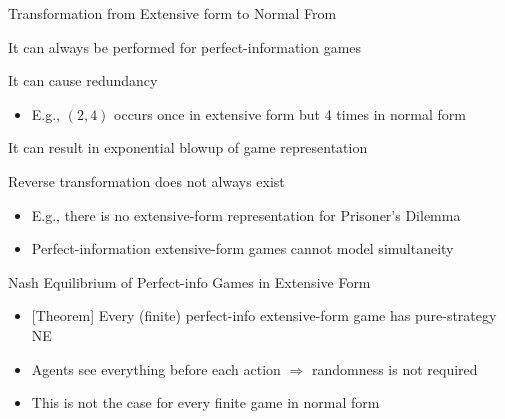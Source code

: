 \documentclass[11pt,aspectratio=169]{beamer}
\begin{document}
  \begin{frame}{Transformation from Extensive form to Normal From}
   \begin{itemizes}
    \item It can \alert{always} be performed for perfect-information games
    \item It can cause redundancy
    \begin{itemize}
     \item E.g., $(2, 4)$ occurs once in extensive form but 4 times in normal form
    \end{itemize}
    \item It can result in \alert{exponential blowup} of game representation
    \item Reverse transformation does not always exist
    \begin{itemize}
     \item E.g., there is \alert{no} extensive-form representation for Prisoner's Dilemma
     \item Perfect-information extensive-form games cannot model \alert{simultaneity}
    \end{itemize}
   \end{itemizes}
  \end{frame}

 
  \begin{frame}{Nash Equilibrium of Perfect-info Games in Extensive Form}
   \begin{itemize}
   \setlength{\itemsep}{1.5em}
    \item \alert{[Theorem]} Every (finite) perfect-info extensive-form game has \alert{pure-strategy} NE
    \item Agents see everything before each action $\Rightarrow$ randomness is not required
    \item This is not the case for every finite game in normal form
   \end{itemize}
  \end{frame}
  
\end{document}
